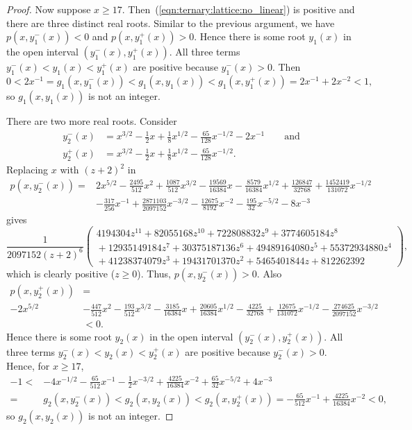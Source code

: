 \documentclass[11pt]{article}
\begin{document}
\begin{proof}
 Now suppose $x \ge 17$.
 Then~(\ref{eqn:ternary:lattice:no_linear}) is positive and there are three distinct real roots.
 Similar to the previous argument,
 we have $p(x, y_1^-(x)) < 0$ and $p(x, y_1^+(x)) > 0$.
 Hence there is some root $y_1(x)$ in the open interval $(y_1^-(x), y_1^+(x))$.
 All three terms $y_1^-(x) < y_1(x) < y_1^+(x)$ are positive because $y_1^-(x) > 0$.
 Then
 \[
  0
  < 2 x^{-1}
  = g_1(x, y_1^-(x))
  < g_1(x, y_1(x))
  < g_1(x, y_1^+(x))
  = 2 x^{-1} + 2 x^{-2}
  < 1,
 \]
 so $g_1(x, y_1(x))$ is not an integer.
 
 There are two more real roots.
 Consider
 \begin{align*}
  y_2^-(x) &= x^{3/2} - \frac{1}{2} x + \frac{1}{8} x^{1/2} - \frac{65}{128} x^{-1/2} - 2 x^{-1}
  \qquad \text{and}\\
  y_2^+(x) &= x^{3/2} - \frac{1}{2} x + \frac{1}{8} x^{1/2} - \frac{65}{128} x^{-1/2}.
 \end{align*}
 Replacing $x$ with $(z + 2)^2$ in
 \begin{align*}
  p(x, y_2^-(x)) = {}
  &2 x^{5/2}
  - \frac{2495}{512} x^2
  + \frac{1087}{512} x^{3/2}
  - \frac{19569}{16384} x
  - \frac{8579}{16384} x^{1/2}
  + \frac{126847}{32768}
  + \frac{1452419}{131072} x^{-1/2}\\
  &- \frac{317}{256} x^{-1}
  + \frac{2871103}{2097152} x^{-3/2}
  - \frac{12675}{8192} x^{-2}
  - \frac{195}{32} x^{-5/2}
  - 8 x^{-3}
 \end{align*}
 gives
 \[
  \frac{1}{2097152 (z+2)^6}
  \left(
   \begin{array}{lll}
    4194304 z^{11}
    + 82055168 z^{10}
    + 722808832 z^9
    + 3774605184 z^8\\
    {}+ 12935149184 z^7
    + 30375187136 z^6
    + 49489164080 z^5
    + 55372934880 z^4\\
    {}+ 41238374079 z^3
    + 19431701370 z^2
    + 5465401844 z
    + 812262392
   \end{array}
  \right),
 \]
 which is clearly positive ($z \ge 0$).
 Thus, $p(x, y_2^-(x)) > 0$.
 Also
 \begin{align*}
  p(x, y_2^+(x)) &=\\
  -2 x^{5/2}
  &- \frac{447}{512} x^2
  - \frac{193}{512} x^{3/2}
  - \frac{3185}{16384} x
  + \frac{20605}{16384} x^{1/2}
  - \frac{4225}{32768}
  + \frac{12675}{131072} x^{-1/2}
  - \frac{274625}{2097152} x^{-3/2}\\
  &< 0.
 \end{align*}
 Hence there is some root $y_2(x)$ in the open interval $(y_2^-(x), y_2^+(x))$.
 All three terms  $y_2^-(x) < y_2(x) < y_2^+(x)$ are positive because $y_2^-(x) > 0$.
 Hence, for $x \ge 17$,
 \begin{align*}
  -1
  < {}& -4 x^{-1/2} - \frac{65}{512} x^{-1} - \frac{1}{2} x^{-3/2} + \frac{4225}{16384} x^{-2} + \frac{65}{32} x^{-5/2} + 4 x^{-3}\\
  = {}&g_2(x, y_2^-(x))
  <    g_2(x, y_2(x))
  <    g_2(x, y_2^+(x))
  =    -\frac{65}{512} x^{-1} + \frac{4225}{16384} x^{-2}
  <    0,
 \end{align*}
 so $g_2(x, y_2(x))$ is not an integer.
 

\end{proof}
\end{document}
